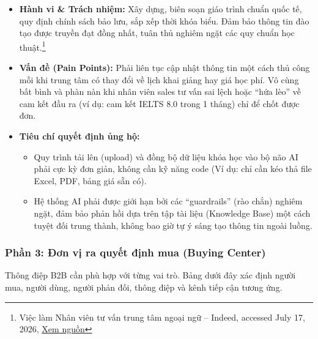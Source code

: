 \begin{itemize}
    \item \textbf{Hành vi \& Trách nhiệm:} Xây dựng, biên soạn giáo trình chuẩn quốc tế, quy định chính sách bảo lưu, sắp xếp thời khóa biểu. Đảm bảo thông tin đào tạo được truyền đạt đồng nhất, tuân thủ nghiêm ngặt các quy chuẩn học thuật.\footnote{Việc làm Nhân viên tư vấn trung tâm ngoại ngữ -- Indeed, accessed July 17, 2026, \href{https://vn.indeed.com/q-nh\%C3\%A2n-vi\%C3\%AAn-t\%C6\%B0-v\%E1\%BA\%A5n-trung-t\%C3\%A2m-ngo\%E1\%BA\%A1i-ng\%E1\%BB\%AF-vi\%E1\%BB\%87c-l\%C3\%A0m.html}{Xem nguồn}}

    \item \textbf{Vấn đề (Pain Points):} Phải liên tục cập nhật thông tin một cách thủ công mỗi khi trung tâm có thay đổi về lịch khai giảng hay giá học phí. Vô cùng bất bình và phàn nàn khi nhân viên sales tư vấn sai lệch hoặc ``hứa lèo'' về cam kết đầu ra (ví dụ: cam kết IELTS 8.0 trong 1 tháng) chỉ để chốt được đơn.

    \item \textbf{Tiêu chí quyết định ủng hộ:}
    \begin{itemize}
        \item Quy trình tải lên (upload) và đồng bộ dữ liệu khóa học vào bộ não AI phải cực kỳ đơn giản, không cần kỹ năng code (Ví dụ: chỉ cần kéo thả file Excel, PDF, bảng giá sẵn có).

        \item Hệ thống AI phải được giới hạn bởi các ``guardrails'' (rào chắn) nghiêm ngặt, đảm bảo phản hồi dựa trên tập tài liệu (Knowledge Base) một cách tuyệt đối trung thành, không bao giờ tự ý sáng tạo thông tin ngoài luồng.
    \end{itemize}
\end{itemize}

\subsubsection{Phần 3: Đơn vị ra quyết định mua (Buying Center)}

Thông điệp B2B cần phù hợp với từng vai trò. Bảng dưới đây xác định người mua, người dùng, người phản đối, thông điệp và kênh tiếp cận tương ứng.

